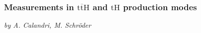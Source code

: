
\newcommand{\bbbar}{\ensuremath{\text{b}\overline{\text{b}}}\xspace}
\newcommand{\ttbar}{\ensuremath{\text{t}\overline{\text{t}}}\xspace}
\newcommand{\ttH}{\ensuremath{\ttbar\text{H}}\xspace}
\newcommand{\tH}{\ensuremath{\text{tH}}\xspace}
\newcommand{\Hbb}{\ensuremath{\text{H}\rightarrow\bbbar}\xspace}
\newcommand{\ttHF}{\ensuremath{\ttbar+\text{HF}}\xspace}
\newcommand{\TeV}{\ensuremath{\,\text{Te\hspace{-.08em}V}}\xspace}
\providecommand{\fbinv}{\mbox{\ensuremath{\,\text{fb}^\text{$-$1}}}\xspace}
\newcommand{\tth}{\ensuremath{\Pqt\Pqt\PH}\xspace}
\newcommand{\ww}{\ensuremath{\PW\PW}\xspace}
\newcommand{\hww}{\ensuremath{\PH\to\ww}\xspace}
\newcommand{\tautau}{\ensuremath{\Pgt\Pgt}\xspace}
\newcommand{\tHW}{\ensuremath{\Pqt\PH\PW}\xspace}
\newcommand{\tHq}{\ensuremath{\Pqt\PH\PQq}\xspace}
\newcommand{\zz}{\ensuremath{\PZ\PZ}\xspace}
\newcommand{\bb}{\ensuremath{\PQb\PQb}\xspace}
\newcommand{\hbb}{\ensuremath{\PH\to\bb}\xspace}
\renewcommand{\gg}{\ensuremath{\PGg\PGg}\xspace}
\newcommand{\hgg}{\ensuremath{\PH\to\gg}\xspace}
\providecommand{\ttjets}{\ensuremath{\PQt\PQt\text{+}\text{jets}}\xspace}

\subsubsection{Measurements in \ttH and \tH production modes}
\begin{center}{\it by A. Calandri, M. Schr\"oder} \end{center}


